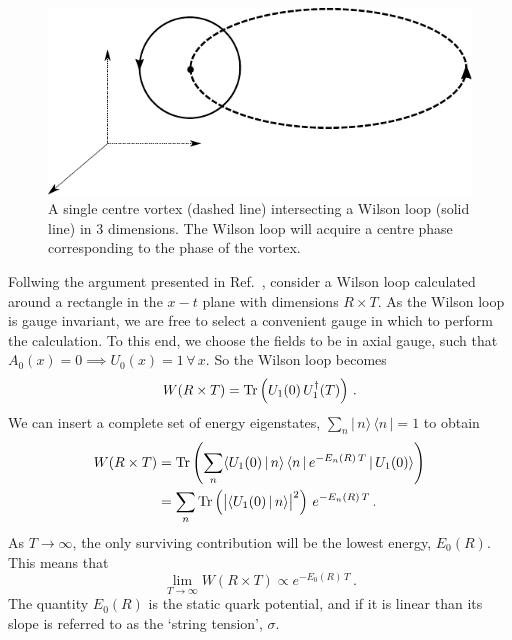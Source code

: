 \begin{figure}
\centering
\includegraphics[width=\linewidth]{./centre_vortex.pdf}
\caption[A single centre vortex intersecting a Wilson loop in 3 dimensions.]{\label{fig:CentreVortex} A single centre vortex (dashed line) intersecting a Wilson loop (solid line) in 3 dimensions. The Wilson loop will acquire a centre phase corresponding to the phase of the vortex.}
\end{figure}
%

Follwing the argument presented in Ref.~\cite{Makeenko:2009dw}, consider a Wilson loop calculated around a rectangle in the $x-t$ plane with dimensions $R\times T$. As the Wilson loop is gauge invariant, we are free to select a convenient gauge in which to perform the calculation. To this end, we choose the fields to be in axial gauge, such that $A_0(x)=0\implies U_0(x) = 1\,\forall\,x$. So the Wilson loop becomes
%
\begin{equation}
W(R\times T) = \operatorname{Tr} \left(U_1(0)\,U_1^\dagger(T)\right)\, .
\end{equation}
%
We can insert a complete set of energy eigenstates, $\sum_n |\,n\rangle\,\langle n \,|=1$ to obtain
%
\begin{align*}
W(R\times T) &= \operatorname{Tr} \left( \sum_n \langle U_1(0)\, |\, n\rangle\,\langle n\, |\, e^{-E_n(R)\, T}\, | \, U_1(0) \rangle\right)\\
&=  \sum_n \operatorname{Tr} \left( \big|\langle U_1(0)\, |\, n\rangle\big|^2 \right)\,e^{-E_n(R)\,T} \, .
\end{align*}
%
As $T\rightarrow \infty$, the only surviving contribution will be the lowest energy, $E_0(R)$. This means that
%
\begin{equation}
\lim_{T\rightarrow \infty} W(R\times T) \propto e^{-E_0(R)\, T}\, .
\label{eq:WilsonEnergy}
\end{equation}
The quantity $E_0(R)$ is the static quark potential, and if it is linear than its slope is referred to as the `string tension', $\sigma$.
\\

